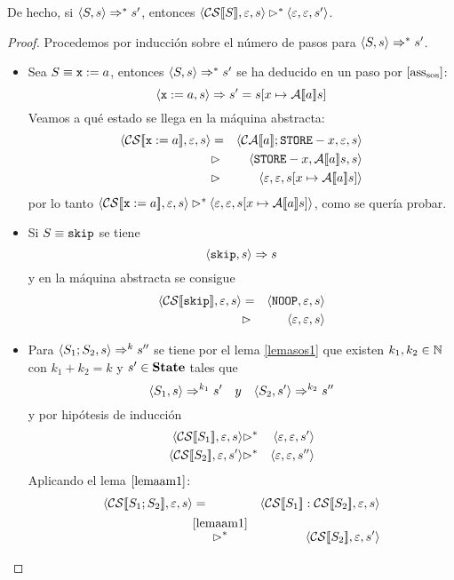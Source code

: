 \begin{lema}
De hecho, si $\langle S, s \rangle\Rightarrow^* s'$, entonces $\langle \mathcal{CS}[\![S]\!], \varepsilon, s \rangle\rhd^* \langle \varepsilon, \varepsilon, s' \rangle$.
\begin{proof} Procedemos por inducción sobre el número de pasos para $\langle S, s \rangle\Rightarrow^* s'$.
\begin{itemize}
    \item Sea $S \equiv \texttt{x}:=a$, entonces $\langle S, s \rangle\Rightarrow^* s'$ se ha deducido en un paso por $[\mathrm{ass}_{\mathrm{sos}}]$:
    \[
        \langle \texttt{x}:=a, s \rangle\Rightarrow s' = s[x\mapsto \mathcal{A}[\![a]\!]s]
    \]
    Veamos a qué estado se llega en la máquina abstracta:
    \begin{eqnarray*}
        \conf{\fc{CS}{\nx:=a}}{\varepsilon}{s} &=& \conf{\fc{CA}{a}; \n{STORE}-x}{\varepsilon}{s} \\
        &\rhd& \conf{\n{STORE}-x}{\fc{A}{a}s}{s} \\
        &\rhd& \conf{\varepsilon}{\varepsilon}{s[x\mapsto \fc{A}{a}s]}
    \end{eqnarray*}
    por lo tanto $\langle \mathcal{CS}[\![\texttt{x}:=a]\!], \varepsilon, s \rangle \rhd^* \langle \varepsilon, \varepsilon, s[x\mapsto \mathcal{A}[\![a]\!]s] \rangle$, como se quería probar.
    \item Si $S \equiv \texttt{skip}$ se tiene 
    \[
        \langle \texttt{skip}, s \rangle\Rightarrow s
    \]
    y en la máquina abstracta se consigue
    \begin{eqnarray*}
        \langle \mathcal{CS}[\![\texttt{skip}]\!], \varepsilon, s \rangle &=& \langle \texttt{NOOP}, \varepsilon, s \rangle \\
        &\rhd & \langle \varepsilon, \varepsilon, s \rangle
    \end{eqnarray*}
    \item Para $\langle S_1; S_2, s \rangle \Rightarrow^k s''$ se tiene por el lema \ref{lemasos1} que existen $k_1, k_2\in\mathbb{N}$ con $k_1 + k_2 = k$ y $s'\in\textbf{State}$  tales que
    \[
        \la{S_1}{s} \dto^{k_1} s'\ \ \ y\ \ \ \la{S_2}{s'} \dto^{k_2} s''
    \]
    y por hipótesis de inducción
    \begin{eqnarray*}
        \langle \mathcal{CS}[\![S_1]\!], \varepsilon, s \rangle &\rhd^*& \langle \varepsilon, \varepsilon, s' \rangle \\
        \langle \mathcal{CS}[\![S_2]\!], \varepsilon, s' \rangle &\rhd^*& \langle \varepsilon, \varepsilon, s'' \rangle
    \end{eqnarray*}
    Aplicando el lema $\ref{lemaam1}$:
    \begin{eqnarray*}
        \conf{\fc{CS}{S_1;S_2}}{\varepsilon}{s} &=&  \conf{\fc{CS}{S_1}:\fc{CS}{S_2}}{\varepsilon}{s} \\
        &\overset{\ref{lemaam1}}{\rhd^*}&  \conf{\fc{CS}{S_2}}{\varepsilon}{s'} \\

\end{eqnarray*}
\end{itemize}
\end{proof}
\end{lema}
